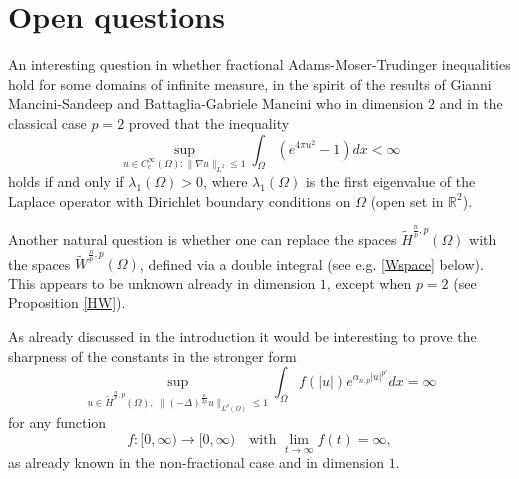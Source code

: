 \documentclass[11pt, a4paper]{article}
\newcommand{\R}{\mathbb{R}}
\begin{document}
\section{Open questions}\label{sec:4}

An interesting question in whether fractional Adams-Moser-Trudinger inequalities hold for some domains of infinite measure, in the spirit of the results of Gianni Mancini-Sandeep \cite{MS} and Battaglia-Gabriele Mancini \cite{BMa} who in dimension $2$ and in the classical case $p=2$ proved that the inequality
\begin{equation}\label{stimaBG}
\sup_{u\in C^\infty_c(\Omega): \|\nabla u\|_{L^2}\le 1} \int_\Omega\left(e^{4\pi u^2}-1\right)dx<\infty
\end{equation}
holds if and only if $\lambda_1(\Omega)>0$, where $\lambda_1(\Omega)$ is the first eigenvalue of the Laplace operator with Dirichlet boundary conditions on $\Omega$ (open set in $\R^2$).

\medskip

Another natural question is whether one can replace the spaces $\tilde H^{\frac{n}{p},p}(\Omega)$ with the spaces $\tilde W^{\frac{n}{p},p}(\Omega)$, defined via a double integral (see e.g. \eqref{Wspace} below). This appears to be unknown already in dimension $1$, except when $p=2$ (see Proposition \ref{HW}).%

\medskip

As already discussed in the introduction it would be interesting to prove the sharpness of the constants in the stronger form
$$\sup_{u\in \tilde H^{\frac{n}{p},p}(\Omega), \;\|(-\Delta)^{\frac{n}{2p}}u\|_{L^{p}(\Omega)}\leq 1}\int_{\Omega} f(|u|)e^{\alpha_{n,p} |u|^{p'}}dx =\infty
$$
for any function
$$f:[0,\infty)\to [0,\infty) \quad \text{with }\lim_{t\to\infty}f(t)=\infty,$$
as already known in the non-fractional case and in dimension $1$.


\end{document}
